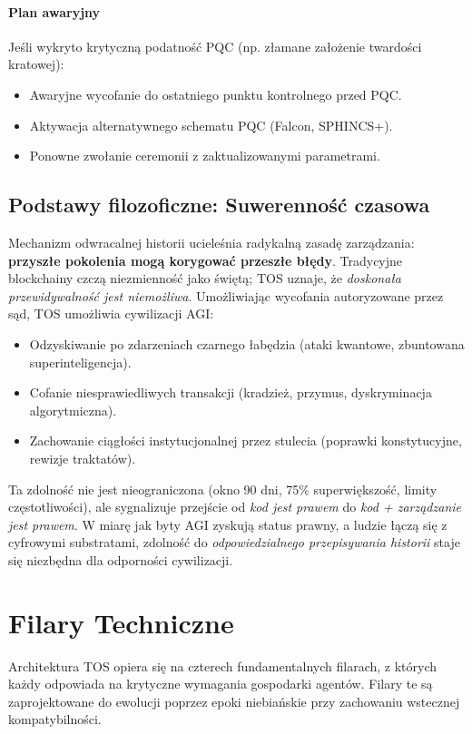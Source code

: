 \documentclass[11pt]{article}
\begin{document}
\paragraph{Plan awaryjny}
Jeśli wykryto krytyczną podatność PQC (np. złamane założenie twardości kratowej):
\begin{itemize}[noitemsep]
  \item Awaryjne wycofanie do ostatniego punktu kontrolnego przed PQC.
  \item Aktywacja alternatywnego schematu PQC (Falcon, SPHINCS+).
  \item Ponowne zwołanie ceremonii z zaktualizowanymi parametrami.
\end{itemize}

\subsection{Podstawy filozoficzne: Suwerenność czasowa}

Mechanizm odwracalnej historii ucieleśnia radykalną zasadę zarządzania: \textbf{przyszłe pokolenia mogą korygować przeszłe błędy}. Tradycyjne blockchainy czczą niezmienność jako świętą; TOS uznaje, że \emph{doskonała przewidywalność jest niemożliwa}. Umożliwiając wycofania autoryzowane przez sąd, TOS umożliwia cywilizacji AGI:
\begin{itemize}[noitemsep]
  \item Odzyskiwanie po zdarzeniach czarnego łabędzia (ataki kwantowe, zbuntowana superinteligencja).
  \item Cofanie niesprawiedliwych transakcji (kradzież, przymus, dyskryminacja algorytmiczna).
  \item Zachowanie ciągłości instytucjonalnej przez stulecia (poprawki konstytucyjne, rewizje traktatów).
\end{itemize}

Ta zdolność nie jest nieograniczona (okno 90 dni, 75\% superwiększość, limity częstotliwości), ale sygnalizuje przejście od \emph{kod jest prawem} do \emph{kod + zarządzanie jest prawem}. W miarę jak byty AGI zyskują status prawny, a ludzie łączą się z cyfrowymi substratami, zdolność do \emph{odpowiedzialnego przepisywania historii} staje się niezbędna dla odporności cywilizacji.

\section{Filary Techniczne}

Architektura TOS opiera się na czterech fundamentalnych filarach, z których każdy odpowiada na krytyczne wymagania gospodarki agentów. Filary te są zaprojektowane do ewolucji poprzez epoki niebiańskie przy zachowaniu wstecznej kompatybilności.
\end{document}
